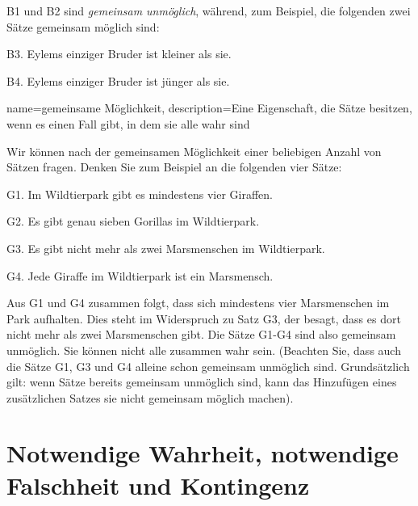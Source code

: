 
B1 und B2 sind \emph{gemeinsam unmöglich}, während, zum Beispiel, die folgenden zwei Sätze gemeinsam möglich sind:
	\begin{ebullet}
		\item[B3.] Eylems einziger Bruder ist kleiner als sie.
		\item[B4.] Eylems einziger Bruder ist jünger als sie.
	\end{ebullet}

{
name=gemeinsame Möglichkeit,
description={Eine Eigenschaft, die Sätze besitzen, wenn es einen Fall gibt, in dem sie alle wahr sind}
}

Wir können nach der gemeinsamen Möglichkeit einer beliebigen Anzahl von Sätzen fragen. Denken Sie zum Beispiel an die folgenden vier Sätze:
	\begin{ebullet}	
		\item[G1.] \label{MartianGiraffes} Im Wildtierpark gibt es mindestens vier Giraffen.
		\item[G2.] Es gibt genau sieben Gorillas im Wildtierpark.
		\item[G3.] Es gibt nicht mehr als zwei Marsmenschen im Wildtierpark.
		\item[G4.] Jede Giraffe im Wildtierpark ist ein Marsmensch.
	\end{ebullet}
Aus G1 und G4 zusammen folgt, dass sich mindestens vier Marsmenschen im Park aufhalten. Dies steht im Widerspruch zu Satz G3, der besagt, dass es dort nicht mehr als zwei Marsmenschen gibt. Die Sätze G1-G4 sind also gemeinsam unmöglich. Sie können nicht alle zusammen wahr sein. (Beachten Sie, dass auch die Sätze G1, G3 und G4 alleine schon gemeinsam unmöglich sind. Grundsätzlich gilt: wenn Sätze bereits gemeinsam unmöglich sind, kann das Hinzufügen eines zusätzlichen Satzes sie nicht gemeinsam möglich machen).

\section{Notwendige Wahrheit, notwendige Falschheit und Kontingenz}

